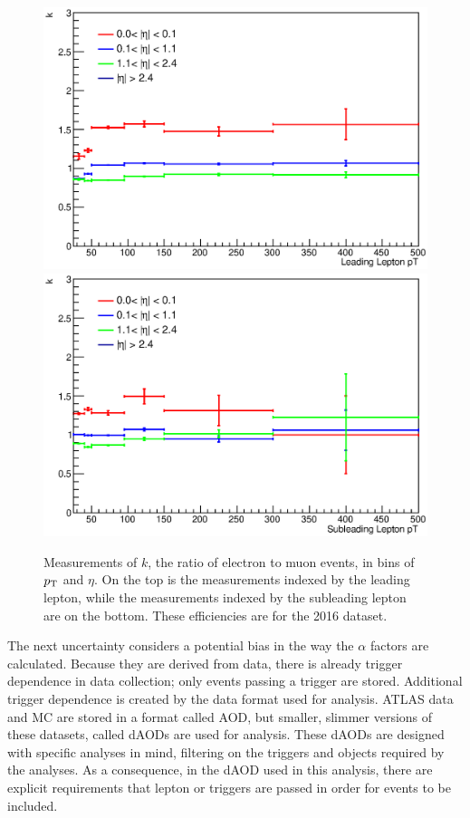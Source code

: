 \begin{centering}
\begin{figure}[bth]
\myfloatalign
\includegraphics[width=.85\linewidth]{figures/fs/data_efficiencies_2j_Z_lep0.eps}
\includegraphics[width=.85\linewidth]{figures/fs/data_efficiencies_2j_Z_lep1.eps}
\caption{Measurements of $k$, the ratio of electron to muon events, in bins of $p_{\text{T}}$ and $\eta$. On the top is the measurements indexed by the leading lepton, while the measurements indexed by the subleading lepton are on the bottom. These efficiencies are for the 2016 dataset.}
\label{fig:fs_k}
\end{figure}
\end{centering}

The next uncertainty considers a potential bias in the way the $\alpha$ factors are calculated. Because they are derived from data, there is already trigger dependence in data collection; only events passing a trigger are stored. Additional trigger dependence is created by the data format used for analysis. ATLAS data and \ac{MC} are stored in a format called \ac{AOD}, but smaller, slimmer versions of these datasets, called \acp{dAOD} are used for analysis. These \acp{dAOD} are designed with specific analyses in mind, filtering on the triggers and objects required by the analyses. As a consequence, in the \ac{dAOD} used in this analysis, there are explicit requirements that lepton or \met triggers are passed in order for events to be included. 

